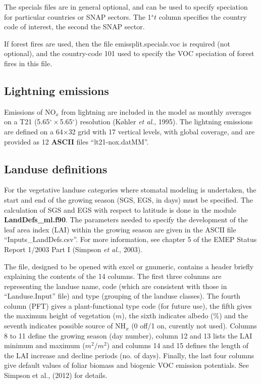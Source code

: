 The specials files are in general optional, and can be used to specify
speciation for particular countries or SNAP sectors. The
1${^st}$ column specifies the country code of interest, the second the SNAP sector. 

If forest fires are used, then the file emissplit.specials.voc is required
(not optional), and the country-code 101 used to specify the VOC speciation
of forest fires in this file.

\subsection{Lightning emissions}
Emissions of NO$_{x}$ from lightning are included in the model
as monthly averages on a T21 (5.65$^{\circ}\times$5.65$^{\circ}$) resolution (K{\o}hler {\sl et al.}, 1995). 
The lightning emissions are defined on a 64$\times$32 grid with 17 vertical
levels, with global coverage, and are provided as 12 {\bf ASCII} files
``lt21-nox.datMM''.



\subsection{Landuse definitions}
For the vegetative landuse categories where stomatal modeling is
undertaken, the start and end of the growing season (SGS, EGS, in days) must be specified. 
The calculation of SGS and EGS with respect to latitude is done 
in the module {\bf LandDefs\_ml.f90}. 
The parameters needed to specify the
development of the leaf area index (LAI) within the growing season
are given in the ASCII file ``Inputs\_LandDefs.csv''. 
For more information, see chapter 5  of the EMEP Status Report 1/2003 Part I (Simpson {\sl et al.}, 2003).


The file, designed to be opened with excel or gnumeric,
contains a header briefly explaining the contents of the 
14 columns. 
The first three columns are representing the landuse name, code (which
are consistent with those in ``Landuse.Input'' file) and
type (grouping of the landuse classes). The fourth column 
(PFT) gives a plant-functional type code (for future use),
 the fifth gives
the maximum height of vegetation ($m$), the sixth indicates albedo (\%) and
the seventh indicates possible source of NH$_{x}$ (0 off/1 on,
curently not used). Columns 8 to 11
define the growing season (day number), column 12 and 13 lists the
LAI minimum  and maximum ($m^{2}/m^{2}$) and 
columns 14 and 15
defines the length of the LAI increase and decline periods (no. of days).
Finally, the last four columns give default values of 
foliar biomass and biogenic VOC emission potentials. See Simpson
et al., (2012) for details.


